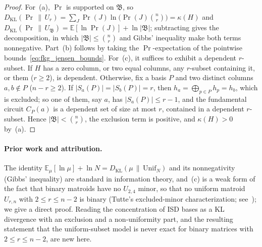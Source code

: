 \documentclass[12pt]{article}
\theoremstyle{definition}
\newcommand{\E}{\mathbb{E}}
\begin{document}
\begin{proof}
For~(a), $\Pr$ is supported on $\mathfrak{B}$, so $D_{\mathrm{KL}}(\Pr \,\|\, U_r) = \sum_J \Pr(J) \ln\bigl(\Pr(J)
\binom{n}{r}\bigr) = \kappa(H)$ and $D_{\mathrm{KL}}(\Pr \,\|\, U_{\mathfrak{B}}) = \E[\ln \Pr(J)] + \ln
|\mathfrak{B}|$; subtracting gives the decomposition, in which $|\mathfrak{B}| \le \binom{n}{r}$ and Gibbs' inequality
make both terms nonnegative. Part~(b) follows by taking the $\Pr$-expectation of the pointwise
bounds~\eqref{eq:fkg_jensen_bounds}. For~(c), it suffices to exhibit a dependent $r$-subset. If $H$ has a zero column,
or two equal columns, any $r$-subset containing it, or them ($r \ge 2$), is dependent. Otherwise, fix a basis $P$ and
two distinct columns $a, b \notin P$ ($n - r \ge 2$). If $|S_a(P)| = |S_b(P)| = r$, then $h_a = \bigoplus_{p \in P} h_p
= h_b$, which is excluded; so one of them, say $a$, has $|S_a(P)| \le r - 1$, and the fundamental circuit $C_P(a)$ is
a dependent set of size at most $r$, contained in a dependent $r$-subset. Hence $|\mathfrak{B}| < \binom{n}{r}$, the
exclusion term is positive, and $\kappa(H) > 0$ by~(a).
\end{proof}

\paragraph{Prior work and attribution.}
The identity $\E_\mu[\ln \mu] + \ln N = D_{\mathrm{KL}}(\mu \,\|\, \mathrm{Unif}_N)$ and its nonnegativity (Gibbs'
inequality) are standard in information theory, and~(c) is a weak form of the fact that binary matroids have no
$U_{2,4}$ minor, so that no uniform matroid $U_{r,n}$ with $2 \le r \le n - 2$ is binary (Tutte's excluded-minor
characterization; see~\cite{Oxley2011}); we give a direct proof. Reading the concentration of ISD bases as a KL
divergence with an exclusion and a non-uniformity part, and the resulting statement that the uniform-subset model is
never exact for binary matrices with $2 \le r \le n - 2$, are new here.
\end{document}
